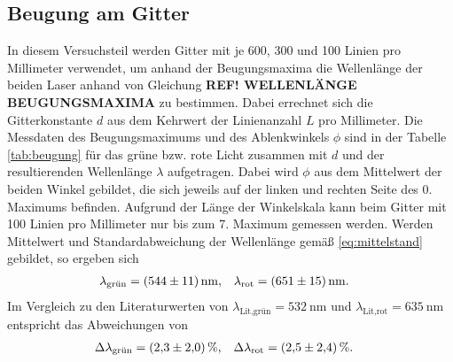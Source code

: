 \subsection{Beugung am Gitter}

In diesem Versuchsteil werden Gitter mit je 600, 300 und 100 Linien pro Millimeter verwendet, um anhand der Beugungsmaxima die Wellenlänge 
der beiden Laser anhand von Gleichung \textbf{REF! WELLENLÄNGE BEUGUNGSMAXIMA} zu bestimmen.
Dabei errechnet sich die Gitterkonstante $d$ aus dem Kehrwert der Linienanzahl $L$ pro Millimeter.
Die Messdaten des Beugungsmaximums und des Ablenkwinkels $\phi$ sind in der Tabelle \ref{tab:beugung} für das grüne bzw. rote Licht
zusammen mit $d$ und der resultierenden Wellenlänge $\lambda$ aufgetragen.
Dabei wird $\phi$ aus dem Mittelwert der beiden Winkel gebildet, die sich jeweils auf der linken und rechten Seite des 0. Maximums befinden.
Aufgrund der Länge der Winkelskala kann beim Gitter mit 100 Linien pro Millimeter nur bis zum 7. Maximum gemessen werden.
Werden Mittelwert und Standardabweichung der Wellenlänge gemäß \eqref{eq:mittelstand} gebildet, so ergeben sich
\begin{align}
    \lambda_\text{grün} & = (\num[]{544 +- 11}) \, \unit[]{\nano\meter}, & \lambda_\text{rot} & = (\num[]{651 +- 15}) \, \unit[]{\nano\meter}.
\end{align}
Im Vergleich zu den Literaturwerten \cite[]{man:v400} von $\lambda_\text{Lit,grün} = \qty[]{532}{\nano\meter}$ und 
$\lambda_\text{Lit,rot} = \qty[]{635}{\nano\meter}$ entspricht das Abweichungen von 
\begin{align}
    \Delta \lambda_\text{grün} &= (\num[]{2.3 +- 2.0}) \, \%, & \Delta \lambda_\text{rot} &= (\num[]{2.5 +- 2.4}) \, \%.
\end{align}



